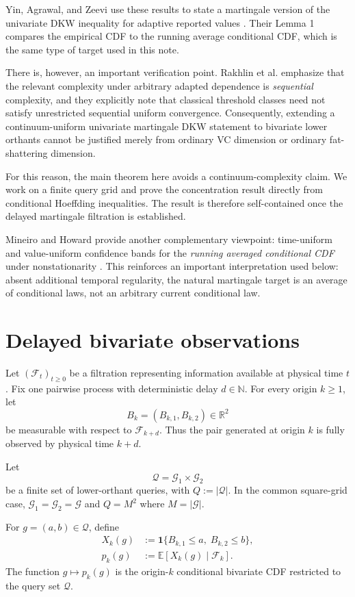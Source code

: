 \documentclass[11pt]{article}
\newcommand{\E}{\mathbb{E}}
\newcommand{\F}{\mathcal{F}}
\newcommand{\G}{\mathcal{G}}
\newcommand{\Q}{\mathcal{Q}}
\newcommand{\1}{\mathbf{1}}
\newcommand{\R}{\mathbb{R}}
\begin{document}
Yin, Agrawal, and Zeevi use these results to state a martingale version of the
univariate DKW inequality for adaptive reported values \cite{yin2022}.  Their
Lemma 1 compares the empirical CDF to the running average conditional CDF,
which is the same type of target used in this note.

There is, however, an important verification point.  Rakhlin et al. emphasize
that the relevant complexity under arbitrary adapted dependence is
\emph{sequential} complexity, and they explicitly note that classical
threshold classes need not satisfy unrestricted sequential uniform
convergence.  Consequently, extending a continuum-uniform univariate
martingale DKW statement to bivariate lower orthants cannot be justified merely
from ordinary VC dimension or ordinary fat-shattering dimension.

For this reason, the main theorem here avoids a continuum-complexity claim.  We
work on a finite query grid and prove the concentration result directly from
conditional Hoeffding inequalities.  The result is therefore self-contained
once the delayed martingale filtration is established.

Mineiro and Howard provide another complementary viewpoint: time-uniform and
value-uniform confidence bands for the \emph{running averaged conditional CDF}
under nonstationarity \cite{mineiro2023}.  This reinforces an important
interpretation used below: absent additional temporal regularity, the natural
martingale target is an average of conditional laws, not an arbitrary current
conditional law.

\section{Delayed bivariate observations}

Let $(\F_t)_{t\ge0}$ be a filtration representing information available at
physical time $t$.  Fix one pairwise process with deterministic delay
$d\in\mathbb N$.  For every origin $k\ge1$, let
\[
    B_k=(B_{k,1},B_{k,2})\in\R^2
\]
be measurable with respect to $\F_{k+d}$.  Thus the pair generated at origin
$k$ is fully observed by physical time $k+d$.

Let
\[
    \Q=\G_1\times\G_2
\]
be a finite set of lower-orthant queries, with
$Q:=|\Q|$.  In the common square-grid case,
$\G_1=\G_2=\G$ and $Q=M^2$ where $M=|\G|$.

For $g=(a,b)\in\Q$, define
\begin{align}
    X_k(g)
    &:=
    \1\{B_{k,1}\le a,\;B_{k,2}\le b\},
    \label{eq:Xkg}
    \\
    p_k(g)
    &:=
    \E[X_k(g)\mid\F_k].
    \label{eq:pkg}
\end{align}
The function $g\mapsto p_k(g)$ is the origin-$k$ conditional bivariate CDF
restricted to the query set $\Q$.
\end{document}

